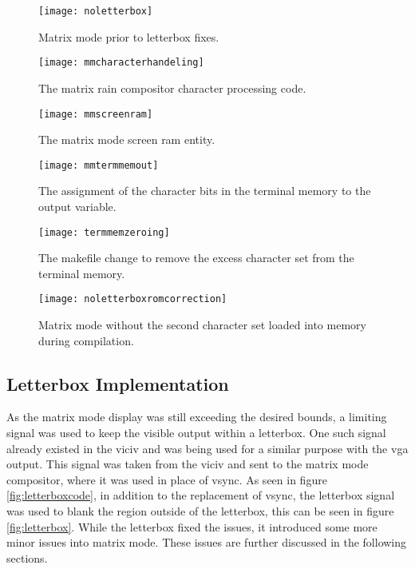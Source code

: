 \begin{figure}
  \centering
  \texttt{[image: noletterbox]}
  \caption{Matrix mode prior to letterbox fixes.}
  \label{fig:noletterbox}
\end{figure}

\begin{figure}
  \centering
  \texttt{[image: mmcharacterhandeling]}
  \caption{The matrix rain compositor character processing code.}
  \label{fig:mmcharacterhandeling}
\end{figure}

\begin{figure}
  \centering
  \texttt{[image: mmscreenram]}
  \caption{The matrix mode screen ram entity.}
  \label{fig:mmscreenram}
\end{figure}

\begin{figure}
  \centering
  \texttt{[image: mmtermmemout]}
  \caption{The assignment of the character bits in the terminal memory to the output variable.}
  \label{fig:mmtermmemout}
\end{figure}

\begin{figure}
  \centering
  \texttt{[image: termmemzeroing]}
  \caption{The makefile change to remove the excess character set from the terminal memory.}
  \label{fig:termmemzeroing}
\end{figure}

\begin{figure}
  \centering
  \texttt{[image: noletterboxromcorrection]}
  \caption{Matrix mode without the second character set loaded into memory during compilation.}
  \label{fig:noletterboxromcorrection}
\end{figure}


\subsection{Letterbox Implementation}

\label{Ch5 Sec2 Sub2}

As the matrix mode display was still exceeding the desired bounds, a limiting signal was used to keep the visible output within a letterbox. One such signal already existed in the viciv and was being used for a similar purpose with the vga output. This signal was taken from the viciv and sent to the matrix mode compositor, where it was used in place of vsync. As seen in figure \ref{fig:letterboxcode}, in addition to the replacement of vsync, the letterbox signal was used to blank the region outside of the letterbox, this can be seen in figure \ref{fig:letterbox}. While the letterbox fixed the issues, it introduced some more minor issues into matrix mode. These issues are further discussed in the following sections.

